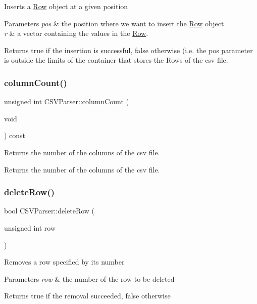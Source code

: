 Inserts a \hyperlink{class_row}{Row} object at a given position 
\begin{DoxyParams}{Parameters}
{\em pos} & the position where we want to insert the \hyperlink{class_row}{Row} object \\
\hline
{\em r} & a vector containing the values in the \hyperlink{class_row}{Row}. \\
\hline
\end{DoxyParams}
\begin{DoxyReturn}{Returns}
true if the insertion is successful, false otherwise (i.\+e. the pos parameter is outside the limits of the container that stores the Rows of the csv file. 
\end{DoxyReturn}
\mbox{\label{class_c_s_v_parser_a1e30268d574a0c1911de002a893d7a7e}} 
\subsubsection{\texorpdfstring{column\+Count()}{columnCount()}}
{\footnotesize\ttfamily unsigned int C\+S\+V\+Parser\+::column\+Count (\begin{DoxyParamCaption}\item[{void}]{ }\end{DoxyParamCaption}) const}

Returns the number of the columns of the csv file. \begin{DoxyReturn}{Returns}
the number of the columns of the csv file. 
\end{DoxyReturn}
\mbox{\label{class_c_s_v_parser_a1bc14d9edecb802c19ad25bd5cab23b3}} 
\subsubsection{\texorpdfstring{delete\+Row()}{deleteRow()}}
{\footnotesize\ttfamily bool C\+S\+V\+Parser\+::delete\+Row (\begin{DoxyParamCaption}\item[{unsigned int}]{row }\end{DoxyParamCaption})}

Removes a row specified by its number 
\begin{DoxyParams}{Parameters}
{\em row} & the number of the row to be deleted \\
\hline
\end{DoxyParams}
\begin{DoxyReturn}{Returns}
true if the removal succeeded, false otherwise 
\end{DoxyReturn}
\mbox{\label{class_c_s_v_parser_ad9a559d1c8de2a7d88a18170c9e11b80}} 
